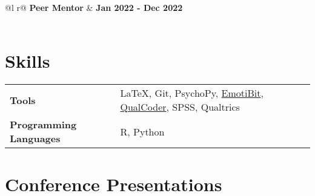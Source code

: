 \documentclass[a4paper,12pt]{article}
\begin{document}
\vspace{0.5em}

\begin{tabularx}{\linewidth}{ @{}l r@{} }
    \textbf{Peer Mentor} & \hfill \textbf{Jan 2022 - Dec 2022} \\[3.75pt]
     \\[3.75pt]
\end{tabularx}

\section{Skills}
\begin{tabularx}{\linewidth}{@{}l X@{}}
\textbf{Tools} &  \normalsize{\LaTeX, Git, PsychoPy, \href{https://www.emotibit.com/}{EmotiBit}, \href{https://github.com/ccbogel/QualCoder}{QualCoder}, SPSS, Qualtrics}\\
\textbf{Programming Languages}  &  \normalsize{R, Python}\\  
\end{tabularx}

\section{Conference Presentations}
\begin{refsection}
\nocite{ho_network_2024}
\nocite{tay_family-eat_2024}
\printbibliography[heading=none]
\end{refsection}
\end{document}
